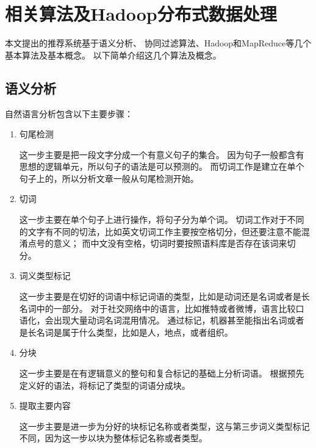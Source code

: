 \chapter{相关算法及Hadoop分布式数据处理}
本文提出的推荐系统基于语义分析、%
协同过滤算法、Hadoop和MapReduce等几个基本算法及基本概念。
以下简单介绍这几个算法及概念。
\section{语义分析}
自然语言分析包含以下主要步骤：
\begin{enumerate}
	\item 句尾检测

	这一步主要是把一段文字分成一个有意义句子的集合\parencite{kiss2006unsupervised}。
	因为句子一般都含有思想的逻辑单元，所以句子的语法是可以预测的。
	而切词工作是建立在单个句子上的，所以分析文章一般从句尾检测开始。
	
	\item 切词
	
	这一步主要在单个句子上进行操作，将句子分为单个词。
	切词工作对于不同的文字有不同的切法，比如英文切词工作主要按空格切分，但还要注意不能混淆点号的意义；
	而中文没有空格，切词时要按照语料库是否存在该词来切分。

	\item 词义类型标记

	这一步主要是在切好的词语中标记词语的类型，比如是动词还是名词或者是长名词中的一部分。
	对于社交网络中的语言，比如推特或者微博，语言比较口语化，会出现大量动词名词混用情况\parencite{Gimpel2011Part,Owoputi2015Improved,Derczynski2013Twitter}。
	通过标记，机器甚至能指出名词或者是长名词是属于什么类型，比如是人，地点，或者组织。
	
	\item 分块
	
	这一步主要是在有逻辑意义的整句和复合标记的基础上分析词语。
	根据预先定义好的语法，将标记了类型的词语分成块。

	\item 提取主要内容

	这一步主要是进一步为分好的块标记名称或者类型，这与第三步词义类型标记不同，因为这一步以块为整体标记名称或者类型。
\end{enumerate}

